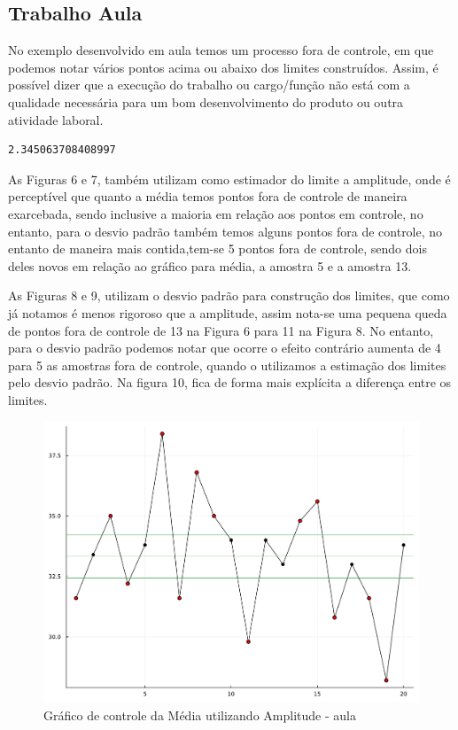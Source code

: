 \documentclass[
  letterpaper,
  DIV=11,
  numbers=noendperiod]{scrartcl}
\begin{document}
\pagebreak

\subsection{Trabalho Aula}

No exemplo desenvolvido em aula temos um processo fora de controle, em
que podemos notar vários pontos acima ou abaixo dos limites construídos.
Assim, é possível dizer que a execução do trabalho ou cargo/função não
está com a qualidade necessária para um bom desenvolvimento do produto
ou outra atividade laboral.

\begin{verbatim}
2.345063708408997
\end{verbatim}

As Figuras 6 e 7, também utilizam como estimador do limite a amplitude,
onde é perceptível que quanto a média temos pontos fora de controle de
maneira exarcebada, sendo inclusive a maioria em relação aos pontos em
controle, no entanto, para o desvio padrão também temos alguns pontos
fora de controle, no entanto de maneira mais contida,tem-se 5 pontos
fora de controle, sendo dois deles novos em relação ao gráfico para
média, a amostra 5 e a amostra 13.

As Figuras 8 e 9, utilizam o desvio padrão para construção dos limites,
que como já notamos é menos rigoroso que a amplitude, assim nota-se uma
pequena queda de pontos fora de controle de 13 na Figura 6 para 11 na
Figura 8. No entanto, para o desvio padrão podemos notar que ocorre o
efeito contrário aumenta de 4 para 5 as amostras fora de controle,
quando o utilizamos a estimação dos limites pelo desvio padrão. Na
figura 10, fica de forma mais explícita a diferença entre os limites.

\begin{figure}

{\centering \includegraphics{trabalho1_files/figure-pdf/fig6-output-1.pdf}

}

\caption{Gráfico de controle da Média utilizando Amplitude - aula}

\end{figure}
\end{document}
